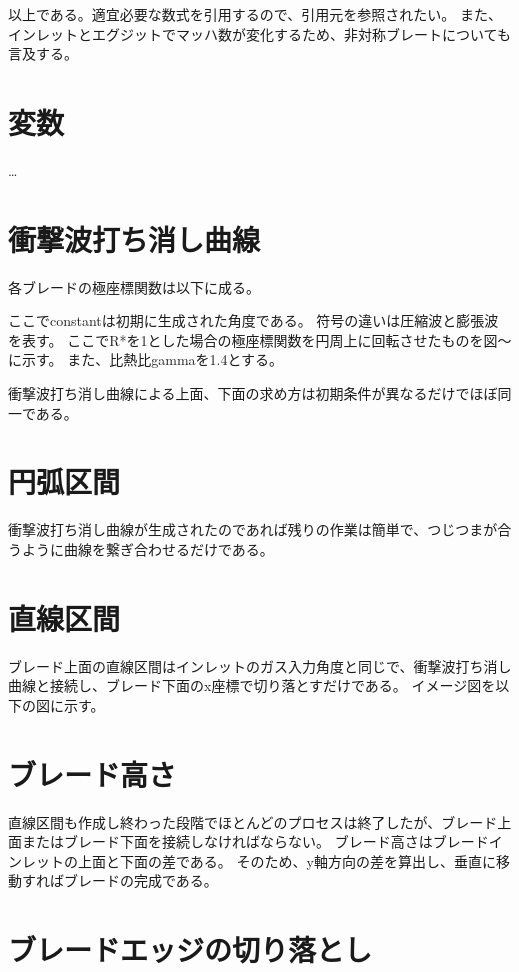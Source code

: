 \documentclass[a4j,10pt,oneside,openany]{jsbook}
\begin{document}
以上である。適宜必要な数式を引用するので、引用元を参照されたい。
また、インレットとエグジットでマッハ数が変化するため、非対称ブレートについても言及する。

\section{変数}
\dots

\section{衝撃波打ち消し曲線}


各ブレードの極座標関数は以下に成る。


ここでconstantは初期に生成された角度である。
符号の違いは圧縮波と膨張波を表す。
ここでR*を1とした場合の極座標関数を円周上に回転させたものを図〜に示す。
また、比熱比gammaを1.4とする。




衝撃波打ち消し曲線による上面、下面の求め方は初期条件が異なるだけでほぼ同一である。


\section{円弧区間}

衝撃波打ち消し曲線が生成されたのであれば残りの作業は簡単で、つじつまが合うように曲線を繋ぎ合わせるだけである。


\section{直線区間}

ブレード上面の直線区間はインレットのガス入力角度と同じで、衝撃波打ち消し曲線と接続し、ブレード下面のx座標で切り落とすだけである。
イメージ図を以下の図に示す。


\section{ブレード高さ}

直線区間も作成し終わった段階でほとんどのプロセスは終了したが、ブレード上面またはブレード下面を接続しなければならない。
ブレード高さはブレードインレットの上面と下面の差である。
そのため、y軸方向の差を算出し、垂直に移動すればブレードの完成である。

\section{ブレードエッジの切り落とし}
\end{document}
